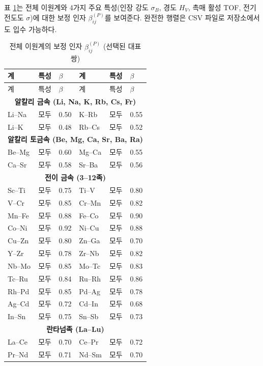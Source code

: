\documentclass[12pt,a4paper]{article}
\begin{document}
	표 \ref{tab:beta-full}는 전체 이원계와 4가지 주요 특성(인장 강도 \(\sigma_B\), 경도 \(H_V\), 촉매 활성 TOF, 전기 전도도 \(\sigma\))에 대한 보정 인자 \(\beta_{ij}^{(P)}\)를 보여준다. 완전한 행렬은 CSV 파일로 저장소에서도 입수 가능하다.
	
	\begin{longtable}{p{1.5cm}p{1.5cm}p{1.2cm}p{1.2cm}p{1.2cm}p{1.2cm}}
		\caption{전체 이원계의 보정 인자 \(\beta_{ij}^{(P)}\) (선택된 대표 쌍)} \label{tab:beta-full} \\
		\toprule
		계 & 특성 & \(\beta\) & 계 & 특성 & \(\beta\) \\
		\midrule
		\endfirsthead
		\toprule
		계 & 특성 & \(\beta\) & 계 & 특성 & \(\beta\) \\
		\midrule
		\endhead
		\multicolumn{6}{c}{\textbf{알칼리 금속 (Li, Na, K, Rb, Cs, Fr)}} \\
		Li–Na & 모두 & 0.50 & K–Rb & 모두 & 0.55 \\
		Li–K  & 모두 & 0.48 & Rb–Cs & 모두 & 0.52 \\
		\multicolumn{6}{c}{\textbf{알칼리 토금속 (Be, Mg, Ca, Sr, Ba, Ra)}} \\
		Be–Mg & 모두 & 0.60 & Mg–Ca & 모두 & 0.55 \\
		Ca–Sr & 모두 & 0.58 & Sr–Ba & 모두 & 0.56 \\
		\multicolumn{6}{c}{\textbf{전이 금속 (3–12족)}} \\
		Sc–Ti & 모두 & 0.75 & Ti–V & 모두 & 0.80 \\
		V–Cr  & 모두 & 0.85 & Cr–Mn & 모두 & 0.82 \\
		Mn–Fe & 모두 & 0.88 & Fe–Co & 모두 & 0.90 \\
		Co–Ni & 모두 & 0.92 & Ni–Cu & 모두 & 0.88 \\
		Cu–Zn & 모두 & 0.80 & Zn–Ga & 모두 & 0.70 \\
		Y–Zr  & 모두 & 0.78 & Zr–Nb & 모두 & 0.82 \\
		Nb–Mo & 모두 & 0.85 & Mo–Tc & 모두 & 0.83 \\
		Tc–Ru & 모두 & 0.84 & Ru–Rh & 모두 & 0.86 \\
		Rh–Pd & 모두 & 0.85 & Pd–Ag & 모두 & 0.78 \\
		Ag–Cd & 모두 & 0.72 & Cd–In & 모두 & 0.68 \\
		In–Sn & 모두 & 0.75 & Sn–Sb & 모두 & 0.73 \\
		\multicolumn{6}{c}{\textbf{란타넘족 (La–Lu)}} \\
		La–Ce & 모두 & 0.70 & Ce–Pr & 모두 & 0.72 \\
		Pr–Nd & 모두 & 0.71 & Nd–Sm & 모두 & 0.70 \\

\end{longtable}
\end{document}
